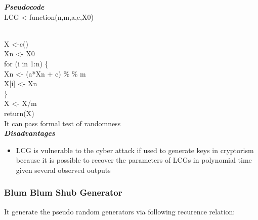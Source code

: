 \documentclass[12pt]{article}
\begin{document}
\textbf{\textit {Pseudocode}}\\
LCG \textless -function(n,m,a,c,X0) {\\
X \textless -c()\\
Xn \textless - X0\\
for (i in 1:n) \{ \\
Xn \textless -  (a*Xn + c) \% \%  m\\
X[i] \textless - Xn\\
\} \\ 
X \textless - X/m\\
return(X)\\
It can pass formal test of randomness\\

\textbf{\textit {Disadvantages}}\\
\begin{itemize}
\item LCG is vulnerable to the cyber attack if used to generate keys in cryptorism  because it is possible to recover the parameters of LCGs in polynomial time given several observed outputs
\end{itemize}

\subsubsection{Blum Blum Shub Generator}

It generate the pseudo random generators via following recurence relation:\\

}
\end{document}
